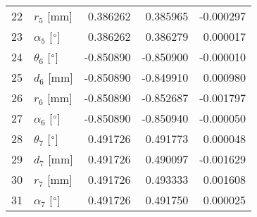 \documentclass{standalone}%
\begin{document}
\begin{tabular}{llrrr}
22 &              $r_{5}$ [mm] &  0.386262 &   0.385965 &  -0.000297 \\
23 &  $\alpha_{5}$ [$\degree$] &  0.386262 &   0.386279 &   0.000017 \\
24 &  $\theta_{6}$ [$\degree$] & -0.850890 &  -0.850900 &  -0.000010 \\
25 &              $d_{6}$ [mm] & -0.850890 &  -0.849910 &   0.000980 \\
26 &              $r_{6}$ [mm] & -0.850890 &  -0.852687 &  -0.001797 \\
27 &  $\alpha_{6}$ [$\degree$] & -0.850890 &  -0.850940 &  -0.000050 \\
28 &  $\theta_{7}$ [$\degree$] &  0.491726 &   0.491773 &   0.000048 \\
29 &              $d_{7}$ [mm] &  0.491726 &   0.490097 &  -0.001629 \\
30 &              $r_{7}$ [mm] &  0.491726 &   0.493333 &   0.001608 \\
31 &  $\alpha_{7}$ [$\degree$] &  0.491726 &   0.491750 &   0.000025 \\
\bottomrule
\end{tabular}
%
\end{document}
